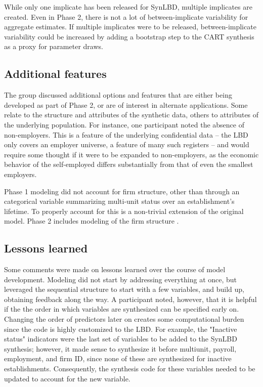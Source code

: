 \documentclass[letterpaper,12pt]{article}
\begin{document}
While only one implicate has been released for SynLBD, multiple implicates are created. Even in Phase 2, there is not a lot of between-implicate variability for aggregate estimates. If multiple implicates were to be released, between-implicate variability could be increased by adding a bootstrap step to the CART synthesis as a proxy for parameter draws. 


\subsection{Additional features}
The group discussed additional options and features that are either being developed as part of Phase 2, or are of interest in alternate applications. Some relate to the structure and attributes of the synthetic data, others to attributes of the underlying population. For instance, one participant noted the absence of non-employers. This is a feature of the underlying confidential data -- the LBD only covers an employer universe, a feature of many such registers -- and would require some thought if it were to be expanded to non-employers, as the economic behavior of the self-employed differs substantially from that of even the smallest employers. 

Phase 1 modeling did not account for firm structure, other than through an categorical variable summarizing multi-unit status over an establishment's lifetime. To properly account for this is a non-trivial extension of the original model.  Phase 2 includes modeling of the firm structure \citep{RePEc:cen:wpaper:14-12}. 

\subsection{Lessons learned}
Some comments were made on lessons learned over the course of model  development. Modeling did not start by addressing everything at once, but leveraged the sequential structure to start with a few variables, and build up,  obtaining feedback along the way. A participant noted, however, that it is helpful if the the order in which variables are synthesized can be specified early on.  
Changing the order of predictors later on creates some computational burden since the code is highly customized to the LBD. For example, the "Inactive status" indicators were the last set of variables to be added to the SynLBD synthesis; however, it made sense to synthesize it before multiunit, payroll, employment, and firm ID, since none of these are synthesized for inactive establishments. Consequently, the synthesis code for these variables needed to be updated to account for the new variable.
\end{document}
